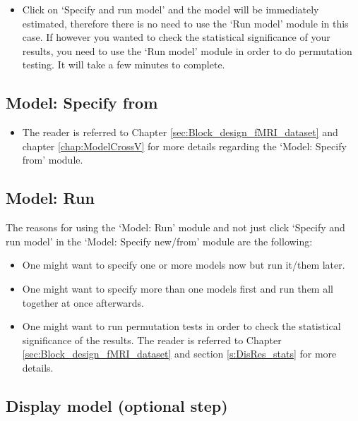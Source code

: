 \begin{itemize}
	\item Click on `Specify and run model' and the model will be immediately estimated, therefore there is no need to use the `Run model' module in this case. If however you wanted to check the statistical significance of your results, you need to use the `Run model' module in order to do permutation testing. It will take a few minutes to complete.

\end{itemize}


\subsection{Model: Specify from}

\begin{itemize}


\item The reader is referred to Chapter \ref{sec:Block_design_fMRI_dataset} and chapter \ref{chap:ModelCrossV} for more details regarding the `Model: Specify from' module.
\end{itemize}

\subsection{Model: Run}

The reasons for using the `Model: Run' module and not just click `Specify and run model' in the `Model: Specify new/from' module are the following:

\begin{itemize}
\item One might want to specify one or more models now but run it/them later.
\item One might want to specify more than one models first and run them all together at once afterwards.
\item One might want to run permutation tests in order to check the statistical significance of the results. The reader is referred to Chapter \ref{sec:Block_design_fMRI_dataset} and section \ref{s:DisRes_stats} for more details.

\end{itemize}


\subsection{Display model (optional step)}

